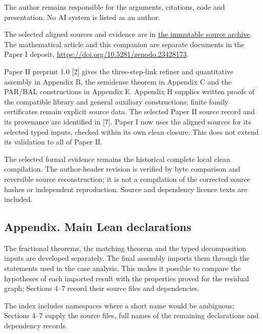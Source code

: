 \documentclass[english,11pt,a4paper]{article}
\begin{document}
The author remains responsible for the arguments, citations, code and presentation. No AI system is listed as an author.

The selected aligned sources and evidence are in \href{https://github.com/jtraverso/nash-williams-triangle-decompositions-release/blob/0d652cde7d8d1f58cb6dd264b30fd3e6dc60f4f7/archives/PAPER_I_LEAN_20261020_ALIGNED_v3.zip}{the immutable source archive}. The mathematical article and this companion are separate documents in the Paper I deposit, \url{https://doi.org/10.5281/zenodo.23428173}.

Paper II preprint 1.0 {[}2{]} gives the three-step-link refiner and quantitative assembly in Appendix B, the semidense theorem in Appendix C and the PAR/BAL constructions in Appendix E. Appendix H supplies written proofs of the compatible library and general auxiliary constructions; finite family certificates remain explicit source data. The selected Paper II source record and its provenance are identified in {[}7{]}. Paper I now uses the aligned sources for its selected typed inputs, checked within its own clean closure. This does not extend its validation to all of Paper II.

The selected formal evidence remains the historical complete local clean compilation. The author-header revision is verified by byte comparison and reversible source reconstruction; it is not a compilation of the corrected source hashes or independent reproduction. Source and dependency licence texts are included.

\subsection{Appendix. Main Lean declarations}\label{appendix.-main-lean-declarations}

The fractional theorems, the matching theorem and the typed decomposition inputs are developed separately. The final assembly imports them through the statements used in the case analysis. This makes it possible to compare the hypotheses of each imported result with the properties proved for the residual graph; Sections 4--7 record their source files and dependencies.

The index includes namespaces where a short name would be ambiguous; Sections 4--7 supply the source files, full names of the remaining declarations and dependency records.
\end{document}
